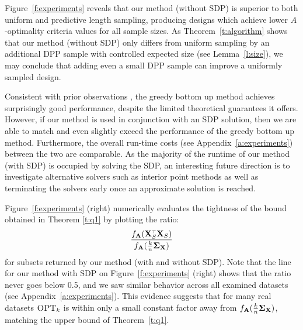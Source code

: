 Figure~\ref{f:experiments} reveals that our method (without SDP) is superior
to both uniform and predictive length sampling, producing designs which
achieve lower $A$-optimality criteria values for all sample sizes.
As Theorem~\ref{t:algorithm} shows that our method (without SDP) only differs
from uniform sampling by an additional DPP sample with controlled
expected size (see Lemma~\ref{l:size}), we may conclude
that adding even a small DPP sample can improve a uniformly sampled design.

Consistent with prior observations
\citep{tractable-experimental-design,chamon2017approximate}, the greedy bottom up
method achieves surprisingly good performance, despite the limited
theoretical guarantees it offers. However, if our method is used
in conjunction with an SDP solution, then we are able to match and
even slightly exceed the performance of the greedy bottom up
method. Furthermore, the overall run-time costs (see Appendix~\ref{a:experiments})
between the two are comparable. As the majority of the runtime of our
method (with SDP) is occupied by solving the SDP, an interesting future direction
is to investigate alternative solvers such as interior point methods as well
as terminating the solvers early once an approximate solution is reached.

Figure~\ref{f:experiments} (right) numerically evaluates the tightness of the
bound obtained in Theorem \ref{t:q1} by plotting the ratio:
\[\frac{f_{\A}(\X_S^\top \X_S)}{ f_{\A}(\frac{k}{n}\Sigmab_\X)}\]
for subsets returned by our method (with and without SDP). Note that the
line for our method with SDP on
Figure~\ref{f:experiments} (right) shows that the ratio never goes
below 0.5, and we saw similar behavior across all examined datasets
(see Appendix~\ref{a:experiments}). This evidence suggests that for
    many real datasets ${\textsc{OPT}_k}$ is within only a small constant factor
    away from $f_{\mathbf A}(\frac{k}{n}\mathbf{\Sigma}_\mathbf X)$, matching the upper bound of
    Theorem~\ref{t:q1}. 

